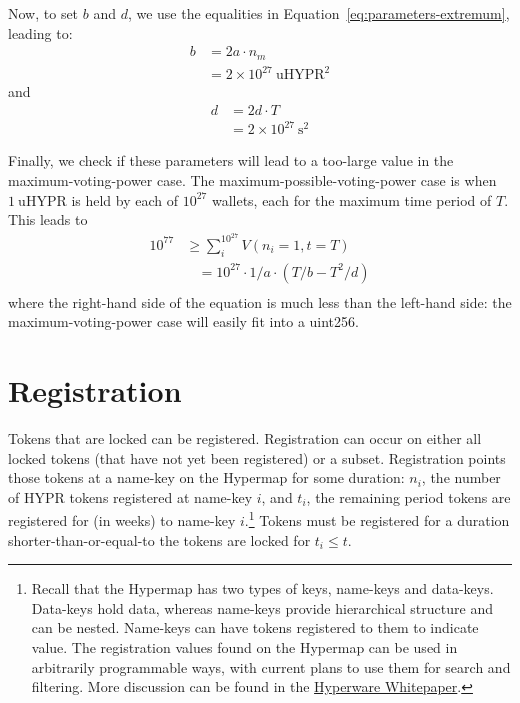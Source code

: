 \documentclass{article}
\begin{document}
Now, to set $b$ and $d$, we use the equalities in Equation~\ref{eq:parameters-extremum}, leading to:
\begin{equation}
\begin{aligned}
b &= 2 a \cdot n_m \\
  &= 2 \times 10^{27}~\text{uHYPR}^2
\end{aligned}
\end{equation}
and
\begin{equation}
\begin{aligned}
d &= 2 d \cdot T \\
  &= 2 \times 10^{27}~\text{s}^2
\end{aligned}
\end{equation}

Finally, we check if these parameters will lead to a too-large value in the maximum-voting-power case.
The maximum-possible-voting-power case is when $1~\text{uHYPR}$ is held by each of $10^{27}$ wallets, each for the maximum time period of $T$.
This leads to
\begin{equation}
\begin{aligned}
10^{77} & \geq \sum_i^{10^{27}} V(n_i = 1, t = T) \\
	&~~~~= 10^{27} \cdot 1/a \cdot (T/b - T^2/d) \\
\end{aligned}
\end{equation}
where the right-hand side of the equation is much less than the left-hand side: the maximum-voting-power case will easily fit into a uint256.

\section{Registration}\label{sec:registration}

Tokens that are locked can be registered.
Registration can occur on either all locked tokens (that have not yet been registered) or a subset.
Registration points those tokens at a name-key on the Hypermap for some duration: $n_i$, the number of HYPR tokens registered at name-key $i$, and $t_i$, the remaining period tokens are registered for (in weeks) to name-key $i$.\footnote{
	Recall that the Hypermap has two types of keys, name-keys and data-keys.
	Data-keys hold data, whereas name-keys provide hierarchical structure and can be nested.
	Name-keys can have tokens registered to them to indicate value.
	The registration values found on the Hypermap can be used in arbitrarily programmable ways, with current plans to use them for search and filtering.
	More discussion can be found in the \href{https://hyperware.ai/whitepaper.pdf}{Hyperware Whitepaper}.
}
Tokens must be registered for a duration shorter-than-or-equal-to the tokens are locked for $t_i \leq t$.
\end{document}
